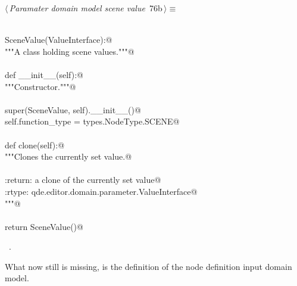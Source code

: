 \documentclass[
    a4paper,      %
    10pt,         %
    openright,    %
    notitlepage,  %
    parskip=half, %
]{scrreprt}       %
\theoremstyle{definition}                    %
\begin{document}
\begin{flushleft} \small
\begin{minipage}{\linewidth}\label{scrap123}\raggedright\small
{} $\langle\,${\itshape Paramater domain model scene value}\nobreak\ {\footnotesize {76b}}$\,\rangle\equiv$
\vspace{-1exm}
\begin{list}{}{} \item
\mbox{}\lstinline@@\\
\mbox{}\lstinline@class SceneValue(ValueInterface):@\\
\mbox{}\lstinline@    """A class holding scene values."""@\\
\mbox{}\lstinline@@\\
\mbox{}\lstinline@    def __init__(self):@\\
\mbox{}\lstinline@        """Constructor."""@\\
\mbox{}\lstinline@@\\
\mbox{}\lstinline@        super(SceneValue, self).__init__()@\\
\mbox{}\lstinline@        self.function_type = types.NodeType.SCENE@\\
\mbox{}\lstinline@@\\
\mbox{}\lstinline@    def clone(self):@\\
\mbox{}\lstinline@        """Clones the currently set value.@\\
\mbox{}\lstinline@@\\
\mbox{}\lstinline@        :return: a clone of the currently set value@\\
\mbox{}\lstinline@        :rtype:  qde.editor.domain.parameter.ValueInterface@\\
\mbox{}\lstinline@        """@\\
\mbox{}\lstinline@@\\
\mbox{}\lstinline@        return SceneValue()@{\NWsep}
\end{list}
\vspace{-1.5ex}
\footnotesize
\begin{list}{}{\setlength{\itemsep}{-\parsep}\setlength{\itemindent}{-\leftmargin}}
\item \NWtxtMacroRefIn\ .

\item{}
\end{list}
\end{minipage}\vspace{4ex}
\end{flushleft}
What now still is missing, is the definition of the node definition input
domain model.
\end{document}
